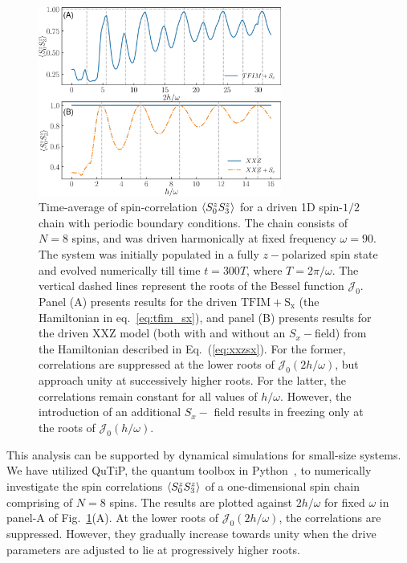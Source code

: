 \documentclass[%
reprint,
superscriptaddress,
amsmath,amssymb,
aps,
prb,
showkeys,
]{revtex4-2}
\begin{document}
\begin{figure}[t!]
	\centering
	\includegraphics[width =8cm]{figure_1.jpeg}
	\caption{Time-average of spin-correlation $\expval{S^z_0 S^z_3}$ for a driven 1D spin-$1/2$ chain with periodic boundary conditions. The chain consists of $N=8$ spins, and was driven harmonically at fixed frequency $\omega=90$.  The system was initially populated in a fully $z-$polarized spin state and evolved numerically till time $t=300T$, where $T=2\pi/\omega$.  The vertical dashed lines represent the roots of the Bessel function $\mathcal{J}_0$.  Panel (A) presents results for  the driven $\mathrm{TFIM+S_x}$ (the  Hamiltonian in eq.~\ref{eq:tfim_sx}), and panel (B) presents results for the driven  $\mathrm{XXZ}$ model (both with and without an $S_x-$field) from the Hamiltonian described in  Eq.~(\ref{eq:xxzsx}).
	For the former, correlations are suppressed at the lower roots of $\mathcal{J}_0\left(2h/\omega\right)$, but approach unity at successively higher roots. For the latter, the correlations remain constant for all values of $h/\omega$. However, the introduction of an additional $S_x-$ field results in freezing only at the roots of $\mathcal{J}_0\left(h/\omega\right)$.}
	\label{fig:ipr:tfimsx}
\end{figure}
This analysis can be supported by dynamical simulations for small-size systems. We have utilized QuTiP, the quantum toolbox in Python~\cite{qutip}, to numerically investigate the spin correlations $\expval{S^z_0 S^z_3}$ of a one-dimensional spin chain comprising of $N=8$ spins. The results are plotted against $2h/\omega$ for fixed $\omega$ in panel-A of  Fig.~\ref{fig:ipr:tfimsx}(A). At the lower roots of $\mathcal{J}_0\left(2h/\omega\right)$,  the correlations are suppressed. However,  they  gradually increase towards unity when the drive parameters are adjusted to lie at progressively higher roots.
\end{document}
